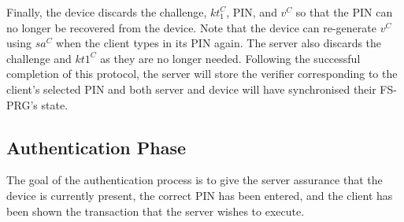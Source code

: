 \documentclass[runningheads]{llncs}
\newcommand{\sss}{\scriptscriptstyle}
\newcommand{\keyt}{\ensuremath{{kt}}}
\newcommand{\salt}{\ensuremath{{sa}}}
\renewcommand{\verifier}{\ensuremath{{v}}}
\newcommand{\VC}[1]{\ensuremath{#1^{\sss C}}}
\begin{document}
Finally, the device discards the challenge, \VC{\keyt_{\sss 1}}, PIN, and \VC{\verifier} so that the PIN can no longer be recovered from the device. Note that the device can re-generate \VC{\verifier} using \VC{\salt} when the client types in its PIN again. The server also discards the challenge and \VC{\keyt{\sss 1}} as they are no longer needed. Following the successful completion of this protocol, the server will store the verifier corresponding to the client's selected PIN and both server and device will have synchronised their FS-PRG's state.

\subsection{Authentication Phase}
\label{sec:authentication}

The goal of the authentication process is to give the server assurance that the device is currently present, the correct PIN has been entered, and the client has been shown the transaction that the server wishes to execute. 
%
\end{document}
